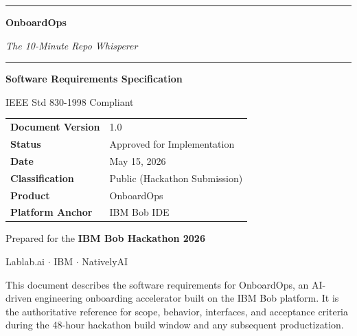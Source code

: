 \documentclass[11pt,letterpaper]{article}
\begin{document}

\begin{titlepage}
\thispagestyle{empty}
\centering
\vspace*{1.5cm}

{\color{ibmblue}\rule{\textwidth}{2pt}}
\vspace{0.8cm}

{\fontsize{42}{50}\selectfont\bfseries\color{ibmblue} OnboardOps\par}
\vspace{0.3cm}
{\Large\itshape\color{ibmgray} The 10-Minute Repo Whisperer\par}
\vspace{0.4cm}

{\color{ibmblue}\rule{\textwidth}{2pt}}
\vspace{2.2cm}

{\huge\bfseries Software Requirements Specification\par}
\vspace{0.4cm}
{\large IEEE Std 830-1998 Compliant\par}
\vspace{3cm}

\begin{tabularx}{0.7\textwidth}{lX}
\toprule
\textbf{Document Version} & 1.0 \\
\textbf{Status} & Approved for Implementation \\
\textbf{Date} & May 15, 2026 \\
\textbf{Classification} & Public (Hackathon Submission) \\
\textbf{Product} & OnboardOps \\
\textbf{Platform Anchor} & IBM Bob IDE \\
\bottomrule
\end{tabularx}

\vfill

{\large Prepared for the \textbf{IBM Bob Hackathon 2026}\par}
{\normalsize Lablab.ai $\cdot$ IBM $\cdot$ NativelyAI\par}
\vspace{0.6cm}
{\small\color{ibmgray} This document describes the software requirements for OnboardOps, an AI-driven engineering onboarding accelerator built on the IBM Bob platform. It is the authoritative reference for scope, behavior, interfaces, and acceptance criteria during the 48-hour hackathon build window and any subsequent productization.\par}
\end{titlepage}
\end{document}
